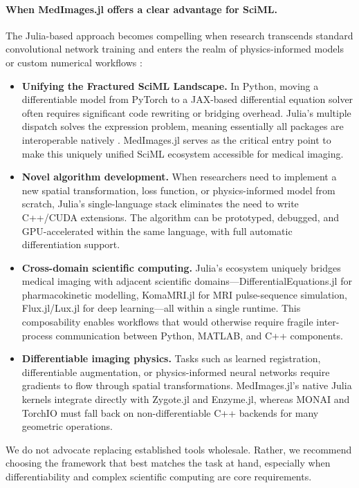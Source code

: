 \documentclass[a4paper,10pt]{elsarticle}
\begin{document}
\paragraph{When MedImages.jl offers a clear advantage for SciML.}
The Julia-based approach becomes compelling when research transcends standard convolutional network training and enters the realm of physics-informed models or custom numerical workflows \cite{RoeschGreener2023}:
\begin{itemize}
    \item \textbf{Unifying the Fractured SciML Landscape.} In Python, moving a differentiable model from PyTorch to a JAX-based differential equation solver often requires significant code rewriting or bridging overhead. Julia's multiple dispatch solves the expression problem, meaning essentially all packages are interoperable natively \cite{PalBhattacharya2024, EschleGl2023}. MedImages.jl serves as the critical entry point to make this uniquely unified SciML ecosystem accessible for medical imaging.
    \item \textbf{Novel algorithm development.} When researchers need to implement a new spatial transformation, loss function, or physics-informed model from scratch, Julia's single-language stack eliminates the need to write C++/CUDA extensions. The algorithm can be prototyped, debugged, and GPU-accelerated within the same language, with full automatic differentiation support.
    \item \textbf{Cross-domain scientific computing.} Julia's ecosystem uniquely bridges medical imaging with adjacent scientific domains---DifferentialEquations.jl for pharmacokinetic modelling, KomaMRI.jl \cite{CastilloPassiCoronado2023} for MRI pulse-sequence simulation, Flux.jl/Lux.jl \cite{pal2023lux} for deep learning---all within a single runtime. This composability enables workflows that would otherwise require fragile inter-process communication between Python, MATLAB, and C++ components.
    \item \textbf{Differentiable imaging physics.} Tasks such as learned registration, differentiable augmentation, or physics-informed neural networks require gradients to flow through spatial transformations. MedImages.jl's native Julia kernels integrate directly with Zygote.jl and Enzyme.jl, whereas MONAI and TorchIO must fall back on non-differentiable C++ backends for many geometric operations.
\end{itemize}

We do not advocate replacing established tools wholesale. Rather, we recommend choosing the framework that best matches the task at hand, especially when differentiability and complex scientific computing are core requirements.
\end{document}
